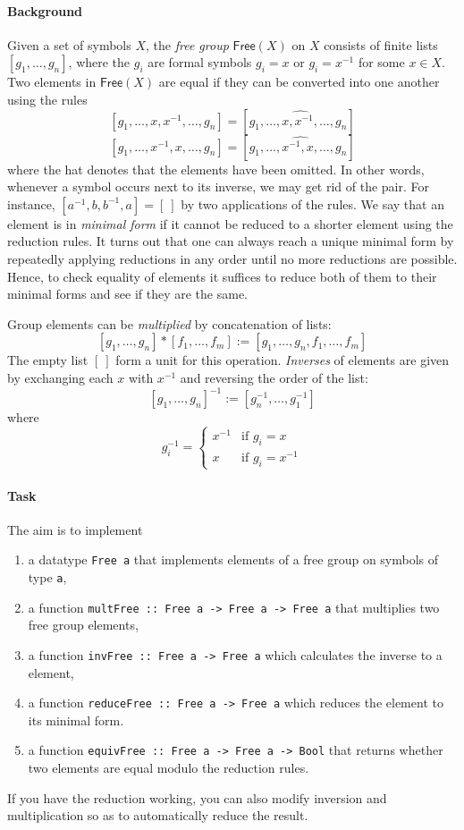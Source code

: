 \documentclass{article}[12pt]
\theoremstyle{definition}
\begin{document}
\paragraph{Background} Given a set of symbols $X$, the \emph{free group} $\mathsf{Free}(X)$ on $X$ consists of finite lists $[g_1, \ldots, g_n]$, where the $g_i$ are formal symbols $g_i = x$ or $g_i = x^{-1}$ for some $x \in X$. Two elements in $\mathsf{Free}(X)$ are equal if they can be converted into one another using the rules
$$[g_1, \ldots, x, x^{-1}, \ldots, g_n] = [g_1, \ldots, \widehat{x, x^{-1},} \ldots, g_n] $$
$$ [g_1, \ldots, x^{-1}, x, \ldots, g_n] = [g_1, \ldots, \widehat{x^{-1}, x,} \ldots, g_n] $$
where the hat denotes that the elements have been omitted. In other words, whenever a symbol occurs next to its inverse, we may get rid of the pair. For instance, $[a^{-1}, b, b^{-1}, a] = [\:]$ by two applications of the rules. We say that an element is in \emph{minimal form} if it cannot be reduced to a shorter element using the reduction rules. It turns out that one can always reach a unique minimal form by repeatedly applying reductions in any order until no more reductions are possible. Hence, to check equality of elements it suffices to reduce both of them to their minimal forms and see if they are the same.

Group elements can be \emph{multiplied} by concatenation of lists:
$$[g_1, \ldots, g_n] * [f_1, \ldots, f_m] := [g_1, \ldots, g_n, f_1, \ldots, f_m] $$
The empty list $[\:]$ form a unit for this operation. \emph{Inverses} of elements are given by exchanging each $x$ with $x^{-1}$ and reversing the order of the list:
$$ [g_1, \ldots, g_n]^{-1} := [g_n^{-1}, \ldots, g_1^{-1}] $$
where 
$$g_i^{-1} = \begin{cases} 
                x^{-1} & \text{if } g_i = x \\
                x      & \text{if } g_i = x^{-1} 
        \end{cases} $$

\paragraph{Task} The aim is to implement
\begin{enumerate}
    \item a datatype \verb|Free a| that implements elements of a free group on symbols of type \verb|a|,
    \item a function \verb|multFree :: Free a -> Free a -> Free a| that multiplies two free group elements,
    \item a function \verb|invFree :: Free a -> Free a| which calculates the inverse to a element,
    \item a function \verb|reduceFree :: Free a -> Free a| which reduces the element to its minimal form.
    \item a function \verb|equivFree :: Free a -> Free a -> Bool| that returns whether two elements are equal modulo the reduction rules.
\end{enumerate}
If you have the reduction working, you can also modify inversion and multiplication so as to automatically reduce the result.
\end{document}
